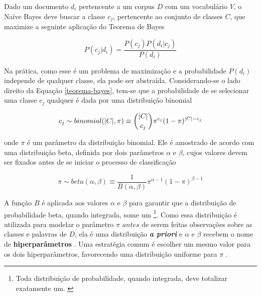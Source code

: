 
Dado um documento \ensuremath{d_i} pertencente a um corpus \ensuremath{D} com um vocabulário \ensuremath{V}, o Naïve Bayes deve buscar a classe \ensuremath{c_j}, pertencente ao conjunto de classes \ensuremath{C}, que maximize a seguinte aplicação do Teorema de Bayes \cite{naive-forty}

\begin{equation}
\label{teorema-bayes}
\ensuremath{P(c_j | d_i) = \frac{P(c_j)P(d_i | c_j)}{P(d_i)}}
\end{equation}



Na prática, como esse é um problema de maximização e a probabilidade \ensuremath{P(d_i)} independe de qualquer classe, ela pode ser abstraída. Considerando-se o lado direito da Equação \ref{teorema-bayes}, tem-se que a probabilidade de se selecionar uma classe \ensuremath{c_j} qualquer é dada por uma distribuição binomial \cite{resnik}

\begin{equation}
\label{binomial}
\ensuremath{c_j \sim binomial(|C|, \pi)  \equiv  \dbinom{|C|}{c_j}\pi^{c_j}(1 - \pi)^{|C| - c_j}}
\end{equation}

onde \ensuremath{\pi} é um parâmetro da distribuição binomial. Ele é amostrado de acordo com uma distribuição beta, definida por dois parâmetros \ensuremath{\alpha} e \ensuremath{\beta}, cujos valores devem ser fixados antes de se iniciar o processo de classificação \cite{resnik}

\begin{equation}
\label{beta}
\ensuremath{\pi \sim beta(\alpha, \beta) \equiv \frac{1}{B(\alpha, \beta)}\pi^{\alpha - 1}(1 - \pi)^{\beta - 1}}
\end{equation}

A função \ensuremath{B} é aplicada aos valores \ensuremath{\alpha} e \ensuremath{\beta} para garantir que a distribuição de probabilidade beta, quando integrada, some um \cite{stat-distribs}\footnote{Toda distribuição de probabilidade, quando integrada, deve totalizar exatamente um. \cite{stat-distribs}}. Como essa distribuição é utilizada para modelar o parâmetro \ensuremath{\pi} \ensuremath{antes} de serem feitas observações sobre as classes e palavras de \ensuremath{D}, ela é uma distribuição \textbf{\emph{a priori}} e \ensuremath{\alpha} e \ensuremath{\beta} recebem o nome de \textbf{hiperparâmetros} \cite{bishop}. Uma estratégia comum é escolher um mesmo valor para os dois hiperparâmetros, favorecendo uma distribuição uniforme para \ensuremath{\pi} \cite{nigam}. %

